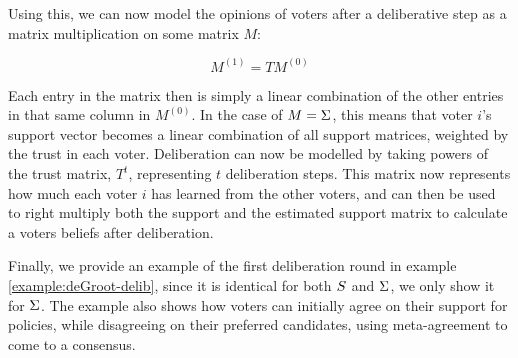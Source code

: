 Using this, we can now model the opinions of voters after a deliberative step as a matrix multiplication on some matrix $M$:

\begin{equation}
	M^{(1)} = TM^{(0)}
	\label{eq:update_degroot}
\end{equation}

Each entry in the matrix then is simply a linear combination of the other entries in that same column in $M^{(0)}$. In the case of $M = \Sigma$, this means that voter $i$'s support vector becomes a linear combination of all support matrices, weighted by the trust in each voter. Deliberation can now be modelled by taking powers of the trust matrix, $T^{t}$, representing $t$ deliberation steps. This matrix now represents how much each voter $i$ has learned from the other voters, and can then be used to right multiply both the support and the estimated support matrix to calculate a voters beliefs after deliberation.

Finally, we provide an example of the first deliberation round in example \ref{example:deGroot-delib}, since it is identical for both $S$ and  $\Sigma$, we only show it for $\Sigma$. The example also shows how voters can initially agree on their support for policies, while disagreeing on their preferred candidates, using meta-agreement to come to a consensus.

